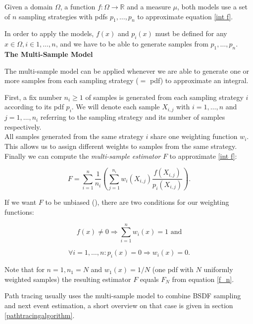 Given a domain $\Omega$, a function $f:\Omega \rightarrow \mathbb{R}$ and a measure $\mu$, both models use a set of $n$ sampling strategies with pdfs $p_1 , \dots, p_n$ to approximate equation \ref{int f}.

In order to apply the models, $f(x)$ and $p_i(x)$ must be defined for any $x\in \Omega, i\in 1, \dots, n$, and we have to be able to generate samples from $p_1, \dots, p_n$.\\


\textbf{The Multi-Sample Model}

The multi-sample model can be applied whenever we are able to generate one or more samples from each sampling strategy ($=$ pdf) to approximate an integral.

First, a fix number $n_i\geq 1$ of samples is generated from each sampling strategy $i$ according to its pdf $p_i$. We will denote each sample $X_{i,j}$ with $i = 1,\dots ,n$ and $j=1,\dots,n_i$ referring to the sampling strategy and its number of samples respectively.\\
All samples generated from the same strategy $i$ share one weighting function $w_i$. This allows us to assign different weights to samples from the same strategy. Finally we can compute the \emph{multi-sample estimator} $F$ to approximate \ref{int f}:

\begin{equation*}
F=\sum_{i=1}^n \frac{1}{n_i} \left( \sum_{j=1}^{n_i} w_i(X_{i,j}) \frac{f(X_{i,j})}{p_i(X_{i,j})} \right).
\end{equation*}

If we want $F$ to be unbiased (\cite[Lemma 9.1]{veachdiss}), there are two conditions for our weighting functions:

\begin{equation}
\label{condw1}
f(x) \neq 0 \Rightarrow \sum_{i=1}^n w_i(x) = 1 \text{ and}
\end{equation}

\begin{equation}
\label{condw2}
\forall i = 1, \dots, n: p_i(x) = 0 \Rightarrow w_i(x) = 0.
\end{equation}

Note that for $n=1, n_1 = N$ and $w_1(x) = 1/N$ (one pdf with $N$ uniformly weighted samples) the resulting estimator $F$ equals $F_N$ from equation \ref{f_n}.

Path tracing usually uses the multi-sample model to combine BSDF sampling and next event estimation, a short overview on that case is given in section \ref{pathtracingalgorithm}.\\



